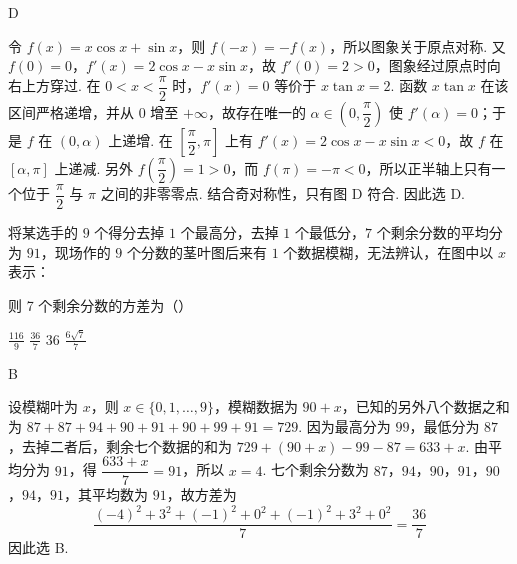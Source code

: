 \begin{answer}
D
\end{answer}

\begin{solution}
令 \(f(x)=x\cos x+\sin x\)，则 \(f(-x)=-f(x)\)，所以图象关于原点对称. 又 \(f(0)=0\)，\(f'(x)=2\cos x-x\sin x\)，故 \(f'(0)=2>0\)，图象经过原点时向右上方穿过. 在 \(0<x<\dfrac{\pi}{2}\) 时，\(f'(x)=0\) 等价于 \(x\tan x=2\). 函数 \(x\tan x\) 在该区间严格递增，并从 \(0\) 增至 \(+\infty\)，故存在唯一的 \(\alpha\in\left(0,\dfrac{\pi}{2}\right)\) 使 \(f'(\alpha)=0\)；于是 \(f\) 在 \((0,\alpha)\) 上递增. 在 \(\left[\dfrac{\pi}{2},\pi\right]\) 上有 \(f'(x)=2\cos x-x\sin x<0\)，故 \(f\) 在 \(\left[\alpha,\pi\right]\) 上递减. 另外 \(f\left(\dfrac{\pi}{2}\right)=1>0\)，而 \(f(\pi)=-\pi<0\)，所以正半轴上只有一个位于 \(\dfrac{\pi}{2}\) 与 \(\pi\) 之间的非零零点. 结合奇对称性，只有图 D 符合. 因此选 D.
\end{solution}

\begin{problem}
将某选手的 \(9\) 个得分去掉 \(1\) 个最高分，去掉 \(1\) 个最低分，\(7\) 个剩余分数的平均分为 \(91\)，现场作的 \(9\) 个分数的茎叶图后来有 \(1\) 个数据模糊，无法辨认，在图中以 \(x\) 表示：



则 7 个剩余分数的方差为（\quad）

\choices
    {\(\frac{116}{9}\)}
    {\(\frac{36}{7}\)}
    {\(36\)}
    {\(\frac{6\sqrt{7}}{7}\)}
\end{problem}

\begin{answer}
B
\end{answer}

\begin{solution}
设模糊叶为 \(x\)，则 \(x\in\{0,1,\ldots,9\}\)，模糊数据为 \(90+x\)，已知的另外八个数据之和为
\(87+87+94+90+91+90+99+91=729\). 因为最高分为 \(99\)，最低分为 \(87\)，去掉二者后，剩余七个数据的和为 \(729+(90+x)-99-87=633+x\). 由平均分为 \(91\)，得 \(\dfrac{633+x}{7}=91\)，所以 \(x=4\). 七个剩余分数为 \(87\)，\(94\)，\(90\)，\(91\)，\(90\)，\(94\)，\(91\)，其平均数为 \(91\)，故方差为
\[
\frac{(-4)^2+3^2+(-1)^2+0^2+(-1)^2+3^2+0^2}{7}=\frac{36}{7}
\]
因此选 B.
\end{solution}

